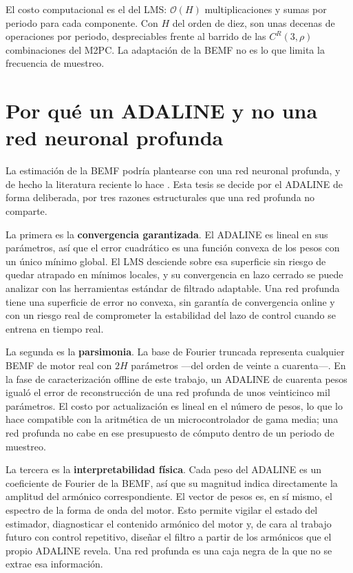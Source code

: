 \documentclass[../../../Tesis_JALS_Maestria.tex]{subfiles}
\begin{document}
El costo computacional es el del LMS: $\mathcal{O}(H)$ multiplicaciones y sumas por periodo para cada componente. Con $H$ del orden de diez, son unas decenas de operaciones por periodo, despreciables frente al barrido de las $C^R(3,\rho)$ combinaciones del M2PC. La adaptación de la BEMF no es lo que limita la frecuencia de muestreo.

\section{Por qué un ADALINE y no una red neuronal profunda}
\label{sec:justificacion}

La estimación de la BEMF podría plantearse con una red neuronal profunda, y de hecho la literatura reciente lo hace \citep{ali2024ann}. Esta tesis se decide por el ADALINE de forma deliberada, por tres razones estructurales que una red profunda no comparte.

La primera es la \textbf{convergencia garantizada}. El ADALINE es lineal en sus parámetros, así que el error cuadrático es una función convexa de los pesos con un único mínimo global. El LMS desciende sobre esa superficie sin riesgo de quedar atrapado en mínimos locales, y su convergencia en lazo cerrado se puede analizar con las herramientas estándar de filtrado adaptable. Una red profunda tiene una superficie de error no convexa, sin garantía de convergencia online y con un riesgo real de comprometer la estabilidad del lazo de control cuando se entrena en tiempo real.

La segunda es la \textbf{parsimonia}. La base de Fourier truncada representa cualquier BEMF de motor real con $2H$ parámetros ---del orden de veinte a cuarenta---. En la fase de caracterización offline de este trabajo, un ADALINE de cuarenta pesos igualó el error de reconstrucción de una red profunda de unos veinticinco mil parámetros. El costo por actualización es lineal en el número de pesos, lo que lo hace compatible con la aritmética de un microcontrolador de gama media; una red profunda no cabe en ese presupuesto de cómputo dentro de un periodo de muestreo.

La tercera es la \textbf{interpretabilidad física}. Cada peso del ADALINE es un coeficiente de Fourier de la BEMF, así que su magnitud indica directamente la amplitud del armónico correspondiente. El vector de pesos es, en sí mismo, el espectro de la forma de onda del motor. Esto permite vigilar el estado del estimador, diagnosticar el contenido armónico del motor y, de cara al trabajo futuro con control repetitivo, diseñar el filtro a partir de los armónicos que el propio ADALINE revela. Una red profunda es una caja negra de la que no se extrae esa información.
\end{document}
